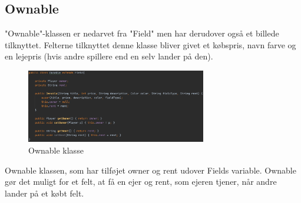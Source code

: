 \subsection{Ownable}
"Ownable"-klassen er nedarvet fra "Field" men har derudover også et billede tilknyttet. Felterne tilknyttet denne klasse bliver givet et købspris, navn farve og en lejepris (hvis andre spillere end en selv lander på den).
\begin{figure}[H]
    \centering
    \includegraphics[width=0.7\textwidth]{sources/7_implementering/Ownable.png}
    \caption{Ownable klasse}
    \label{fig:Ownable}
\end{figure}
Ownable klassen, som har tilføjet owner og rent udover Fields variable. Ownable gør det muligt for et felt, at få en ejer og rent, som ejeren tjener, når andre lander på et købt felt.